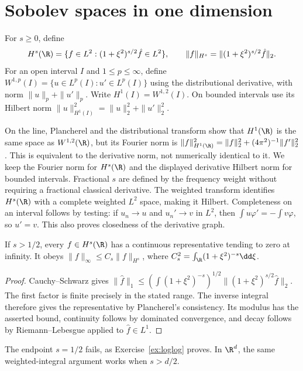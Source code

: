\section{Sobolev spaces in one dimension}

\begin{definition}
For $s\ge0$, define
\[
H^s(\R)=\{f\in L^2:(1+\xi^2)^{s/2}\hat f\in L^2\},\qquad
\|f\|_{H^s}=\|(1+\xi^2)^{s/2}\hat f\|_2.
\]
For an open interval $I$ and $1\le p\le\infty$, define $W^{1,p}(I)=\{u\in L^p(I):u'\in L^p(I)\}$ using the distributional derivative, with norm $\|u\|_p+\|u'\|_p$. Write $H^1(I)=W^{1,2}(I)$. On bounded intervals use its Hilbert norm $\|u\|_{H^1(I)}^2=\|u\|_2^2+\|u'\|_2^2$.
\end{definition}

On the line, Plancherel and the distributional transform show that $H^1(\R)$ is the same space as $W^{1,2}(\R)$, but its Fourier norm is
$\|f\|_{H^1(\R)}^2=\|f\|_2^2+(4\pi^2)^{-1}\|f'\|_2^2$.
This is equivalent to the derivative norm, not numerically identical to it. We keep the Fourier norm for $H^s(\R)$ and the displayed derivative Hilbert norm for bounded intervals. Fractional $s$ are defined by the frequency weight without requiring a fractional classical derivative.
The weighted transform identifies $H^s(\R)$ with a complete weighted $L^2$ space, making it Hilbert. Completeness on an interval follows by testing: if $u_n\to u$ and $u_n'\to v$ in $L^2$, then $\int u\varphi'=-\int v\varphi$, so $u'=v$. This also proves closedness of the derivative graph.

\begin{theorem}\label{thm:sobolevR}
If $s>1/2$, every $f\in H^s(\R)$ has a continuous representative tending to zero at infinity. It obeys
$\|f\|_\infty\le C_s\|f\|_{H^s}$,
where $C_s^2=\int_{\R}(1+\xi^2)^{-s}\dd\xi$.
\end{theorem}
\begin{proof}
Cauchy--Schwarz gives
$\|\hat f\|_1\le(\int(1+\xi^2)^{-s})^{1/2}\|(1+\xi^2)^{s/2}\hat f\|_2$.
The first factor is finite precisely in the stated range. The inverse integral therefore gives the representative by Plancherel's consistency. Its modulus has the asserted bound, continuity follows by dominated convergence, and decay follows by Riemann--Lebesgue applied to $\hat f\in L^1$.
\end{proof}

The endpoint $s=1/2$ fails, as Exercise~\ref{ex:loglog} proves. In $\R^d$, the same weighted-integral argument works when $s>d/2$.

